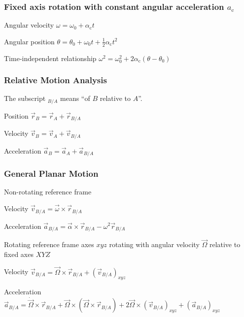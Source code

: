 \documentclass{article}
\begin{document}
\subsubsection{Fixed axis rotation with constant angular acceleration \(a_\mathrm{c}\)}

\begin{description*}
\item[Angular velocity]
  \(\omega = \omega_0 + \alpha_\mathrm{c}t\)
\item[Angular position]
  \(\theta = \theta_0 + \omega_0t + \frac12\alpha_\mathrm{c}t^2\)
\item[Time-independent relationship]
  \(\omega^2 = \omega_0^2 + 2\alpha_\mathrm{c}(\theta-\theta_0)\)
\end{description*}

\subsubsection{Relative Motion Analysis}

The subscript ${}_{B/A}$ means ``of $B$ relative to $A$''.

\begin{description*}
\item[Position]
  \(\vec{r}_B = \vec{r}_A + \vec{r}_{B/A}\)
\item[Velocity]
  \(\vec{v}_B = \vec{v}_A + \vec{v}_{B/A}\)
\item[Acceleration]
  \(\vec{a}_B = \vec{a}_A + \vec{a}_{B/A}\)
\end{description*}

\subsubsection{General Planar Motion}

\begin{description*}
\item[Non-rotating reference frame]~
  \begin{description*}
  \item[Velocity]
    \(\vec{v}_{B/A} = \vec{\omega}\times\vec{r}_{B/A}\)
  \item[Acceleration]
    \(\vec{a}_{B/A} = \vec\alpha\times\vec{r}_{B/A} - \omega^2\vec{r}_{B/A}\)
  \end{description*}
\item[Rotating reference frame] axes $xyz$ rotating with angular velocity $\vec\Omega$
  relative to fixed axes $XYZ$
  \begin{description*}
  \item[Velocity]
    \(\vec{v}_{B/A} = \vec\Omega\times\vec{r}_{B/A} + (\vec{v}_{B/A})_{xyz}\)
  \item[Acceleration]
    \(\vec{a}_{B/A} = \dot{\vec\Omega}\times\vec{r}_{B/A} + \vec\Omega\times(\vec\Omega\times\vec{r}_{B/A})
    + 2\vec\Omega\times(\vec{v}_{B/A})_{xyz} + (\vec{a}_{B/A})_{xyz}\)
  \end{description*}
\end{description*}
\end{document}

